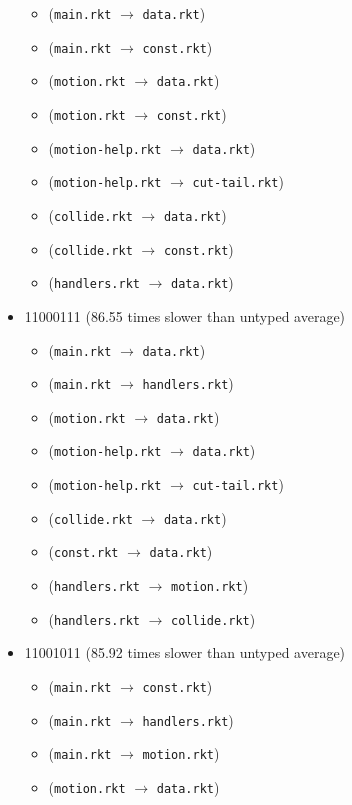\documentclass{article}
\newcommand{\mono}[1]{\texttt{#1}}
\begin{document}
\begin{itemize}
  \begin{itemize}
  \item (\mono{main.rkt} $\rightarrow$ \mono{data.rkt})
  \item (\mono{main.rkt} $\rightarrow$ \mono{const.rkt})
  \item (\mono{motion.rkt} $\rightarrow$ \mono{data.rkt})
  \item (\mono{motion.rkt} $\rightarrow$ \mono{const.rkt})
  \item (\mono{motion-help.rkt} $\rightarrow$ \mono{data.rkt})
  \item (\mono{motion-help.rkt} $\rightarrow$ \mono{cut-tail.rkt})
  \item (\mono{collide.rkt} $\rightarrow$ \mono{data.rkt})
  \item (\mono{collide.rkt} $\rightarrow$ \mono{const.rkt})
  \item (\mono{handlers.rkt} $\rightarrow$ \mono{data.rkt})
  \end{itemize}
\item 11000111 (86.55 times slower than untyped average)
  \begin{itemize}
  \item (\mono{main.rkt} $\rightarrow$ \mono{data.rkt})
  \item (\mono{main.rkt} $\rightarrow$ \mono{handlers.rkt})
  \item (\mono{motion.rkt} $\rightarrow$ \mono{data.rkt})
  \item (\mono{motion-help.rkt} $\rightarrow$ \mono{data.rkt})
  \item (\mono{motion-help.rkt} $\rightarrow$ \mono{cut-tail.rkt})
  \item (\mono{collide.rkt} $\rightarrow$ \mono{data.rkt})
  \item (\mono{const.rkt} $\rightarrow$ \mono{data.rkt})
  \item (\mono{handlers.rkt} $\rightarrow$ \mono{motion.rkt})
  \item (\mono{handlers.rkt} $\rightarrow$ \mono{collide.rkt})
  \end{itemize}
\item 11001011 (85.92 times slower than untyped average)
  \begin{itemize}
  \item (\mono{main.rkt} $\rightarrow$ \mono{const.rkt})
  \item (\mono{main.rkt} $\rightarrow$ \mono{handlers.rkt})
  \item (\mono{main.rkt} $\rightarrow$ \mono{motion.rkt})
  \item (\mono{motion.rkt} $\rightarrow$ \mono{data.rkt})

\end{itemize}
\end{itemize}
\end{document}
